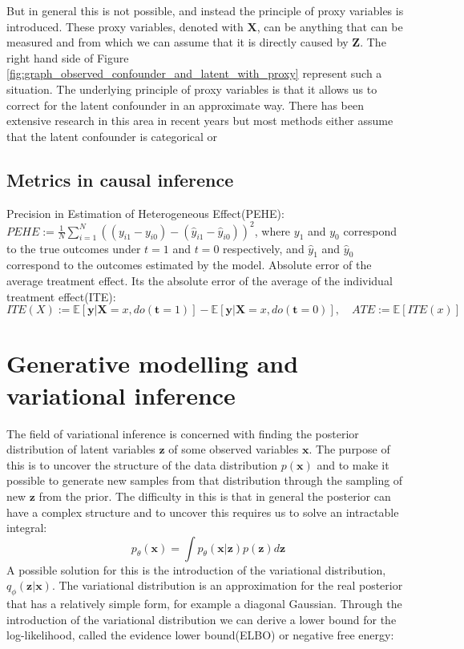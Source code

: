 \documentclass{report}
\newcommand{\E}{\mathbb{E}}
\newcommand{\bt}{\mathbf{t}}
\newcommand{\bX}{\mathbf{X}}
\newcommand{\bx}{\mathbf{x}}
\newcommand{\by}{\mathbf{y}}
\newcommand{\bZ}{\mathbf{Z}}
\newcommand{\bz}{\mathbf{z}}
\begin{document}
But in general this is not possible, and instead the principle of proxy variables is introduced. These proxy variables, denoted with $\bX$, can be anything that can be measured and from which we can assume that it is directly caused by $\bZ$. The right hand side of Figure \ref{fig:graph_observed_confounder_and_latent_with_proxy} represent such a situation. The underlying principle of proxy variables is that it allows us to correct for the latent confounder in an approximate way. There has been extensive research in this area in recent years but most methods either assume that the latent confounder is categorical or 

\section{Metrics in causal inference}
Precision in Estimation of Heterogeneous Effect(PEHE): $PEHE := \frac{1}{N}\sum\limits^N_{i=1}((y_{i1} - y_{i0}) - (\hat{y}_{i1} - \hat{y}_{i0}))^2$, where $y_1$ and $y_0$ correspond to the true outcomes under $t=1$ and $t=0$ respectively, and $\hat{y}_1$ and $\hat{y}_0$ correspond to the outcomes estimated by the model. 
Absolute error of the average treatment effect. Its the absolute error of the average of the individual treatment effect(ITE): 
\begin{equation}
    ITE(X) := \E[\by | \bX=x, do(\bt=1)] - \E[\by | \bX=x, do(\bt=0)], \quad ATE := \E[ITE(x)]
\end{equation}


\chapter{Generative modelling and variational inference}
The field of variational inference is concerned with finding the posterior distribution of latent variables $\bz$ of some observed variables $\bx$. The purpose of this is to uncover the structure of the data distribution $p(\bx)$ and to make it possible to generate new samples from that distribution through the sampling of new $\bz$ from the prior\footnotemark[\ref{note:citation}]. The difficulty in this is that in general the posterior can have a complex structure and to uncover this requires us to solve an intractable integral:
\begin{equation}
    p_\theta(\bx) = \int p_\theta(\bx|\bz)p(\bz) d\bz
\end{equation}
A possible solution for this is the introduction of the variational distribution, $q_\phi(\bz|\bx)$\footnotemark[\ref{note:citation}]. The variational distribution is an approximation for the real posterior that has a relatively simple form, for example a diagonal Gaussian. Through the introduction of the variational distribution we can derive a lower bound for the log-likelihood, called the evidence lower bound(ELBO) or negative free energy\footnotemark[\ref{note:citation}]:
\end{document}
